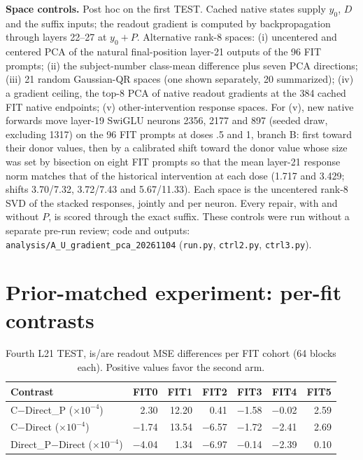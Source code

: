 \documentclass[11pt]{article}
\begin{document}
\textbf{Space controls.} Post hoc on the first TEST. Cached native states supply $y_0$, $D$ and the suffix inputs; the readout gradient is computed by backpropagation through layers 22--27 at $y_0+P$. Alternative rank-8 spaces: (i) uncentered and centered PCA of the natural final-position layer-21 outputs of the 96 FIT prompts; (ii) the subject-number class-mean difference plus seven PCA directions; (iii) 21 random Gaussian-QR spaces (one shown separately, 20 summarized); (iv) a gradient ceiling, the top-8 PCA of native readout gradients at the 384 cached FIT native endpoints; (v) other-intervention response spaces. For (v), new native forwards move layer-19 SwiGLU neurons 2356, 2177 and 897 (seeded draw, excluding 1317) on the 96 FIT prompts at doses .5 and 1, branch B: first toward their donor values, then by a calibrated shift toward the donor value whose size was set by bisection on eight FIT prompts so that the mean layer-21 response norm matches that of the historical intervention at each dose (1.717 and 3.429; shifts 3.70/7.32, 3.72/7.43 and 5.67/11.33). Each space is the uncentered rank-8 SVD of the stacked responses, jointly and per neuron. Every repair, with and without $P$, is scored through the exact suffix. These controls were run without a separate pre-run review; code and outputs: \texttt{analysis/A\_U\_gradient\_pca\_20261104} (\texttt{run.py}, \texttt{ctrl2.py}, \texttt{ctrl3.py}).

\section{Prior-matched experiment: per-fit contrasts}\label{app:prior}
\begin{table}[ht]\centering\small
\begin{tabular}{lrrrrrr}\toprule Contrast & FIT0 & FIT1 & FIT2 & FIT3 & FIT4 & FIT5\\\midrule
C$-$Direct\_P ($\times10^{-4}$) & 2.30 & 12.20 & 0.41 & $-$1.58 & $-$0.02 & 2.59\\
C$-$Direct ($\times10^{-4}$) & $-$1.74 & 13.54 & $-$6.57 & $-$1.72 & $-$2.41 & 2.69\\
Direct\_P$-$Direct ($\times10^{-4}$) & $-$4.04 & 1.34 & $-$6.97 & $-$0.14 & $-$2.39 & 0.10\\\bottomrule\end{tabular}
\caption{Fourth L21 TEST, is/are readout MSE differences per FIT cohort (64 blocks each). Positive values favor the second arm.}\label{tab:priorfits}
\end{table}
\end{document}

